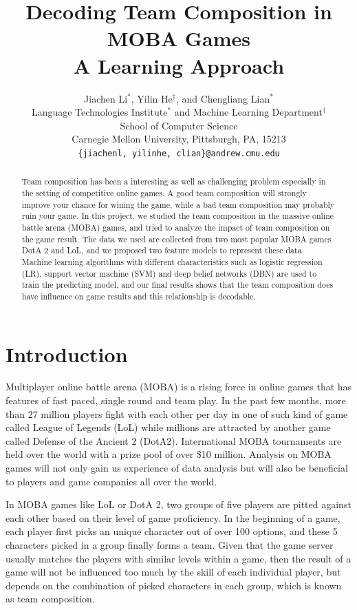 \documentclass{article} %
\title{Decoding Team Composition in MOBA Games \\ A Learning Approach}
\author{
Jiachen Li$^*$, Yilin He$^\dag$, and Chengliang Lian$^*$\\
Language Technologies Institute$^*$ and Machine Learning Department$^\dag$ \\ School of Computer Science \\
Carnegie Mellon University, Pittsburgh, PA, 15213 \\
\texttt{\{jiachenl, yilinhe, clian\}@andrew.cmu.edu}
}
\begin{document}
\maketitle

\begin{abstract}
Team composition has been a interesting as well as challenging problem especially in the setting of competitive online games. A good team composition will strongly improve your chance for wining the game, while a bad team composition may probably ruin your game.
In this project, we studied the team composition in the massive online battle arena (MOBA) games, and tried to analyze the impact of team composition on the game result. The data we used are collected from two most popular MOBA games DotA 2 and LoL, and we proposed two feature models to represent these data. Machine learning algorithms with different characteristics such as logistic regression (LR), support vector machine (SVM) and deep belief networks (DBN) are used to train the predicting model, and our final results shows that the team composition does have influence on game results and this relationship is decodable.
\end{abstract}

\section{Introduction}



Multiplayer online battle arena (MOBA) is a rising force in online games that has features of fast paced, single round and team play. In the past few months, more than 27 million players fight with each other per day in one of such kind of game called League of Legends (LoL)\cite{Ian} while millions are attracted by another game called Defense of the Ancient 2 (DotA2). International MOBA tournaments are held over the world with a prize pool of over \$10 million\cite{Valve}.  Analysis on MOBA games will not only gain us experience of data analysis but will also be beneficial to players and game companies all over the world.

In MOBA games like LoL or DotA 2, two groups of five players are pitted against each other based on their level of game proficiency. In the beginning of a game, each player first picks an unique character out of over 100 options, and these 5 characters picked in a group finally forms a team. Given that the game server usually matches the players with similar levels within a game, then the result of a game will not be influenced too much by the skill of each individual player, but depends on the combination of
picked characters in each group, which is known as team composition.
\end{document}
